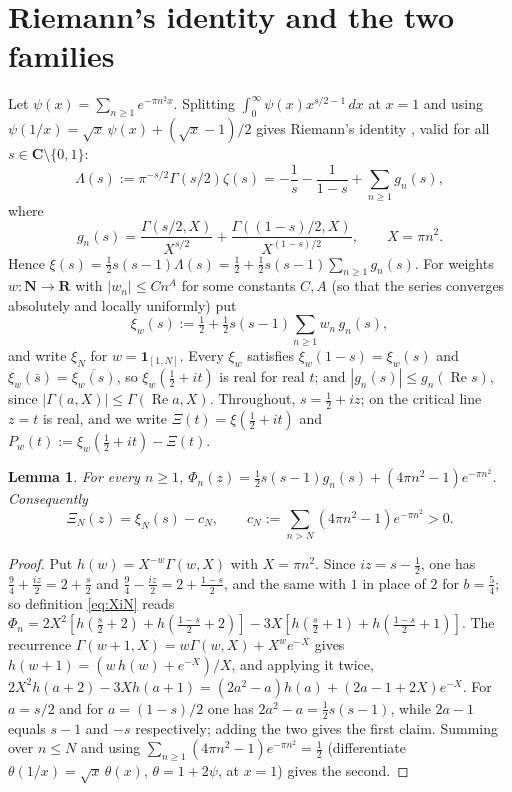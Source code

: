 \documentclass[11pt]{article}
\theoremstyle{plain}
\newtheorem{lemma}[theorem]{Lemma}
\theoremstyle{definition}
\theoremstyle{remark}
\newcommand{\R}{\mathbf{R}}
\newcommand{\Cx}{\mathbf{C}}
\newcommand{\N}{\mathbf{N}}
\newcommand{\re}{\operatorname{Re}}
\begin{document}
\section{Riemann's identity and the two families}
\label{sec:riemann}

Let $\psi(x) = \sum_{n \ge 1} e^{-\pi n^2 x}$. Splitting
$\int_0^\infty \psi(x)x^{s/2-1}\,dx$ at $x = 1$ and using
$\psi(1/x) = \sqrt{x}\,\psi(x) + (\sqrt{x}-1)/2$ gives Riemann's identity
\cite{Rie, Edw}, valid for all $s \in \Cx \setminus \{0, 1\}$:
\begin{equation}\label{eq:riemann}
\Lambda(s) := \pi^{-s/2}\Gamma(s/2)\zeta(s) = -\frac1s - \frac{1}{1-s}
+ \sum_{n \ge 1} g_n(s),
\end{equation}
where
\[
g_n(s) = \frac{\Gamma(s/2, X)}{X^{s/2}} + \frac{\Gamma((1-s)/2, X)}{X^{(1-s)/2}},
\qquad X = \pi n^2 .
\]
Hence $\xi(s) = \tfrac12 s(s-1)\Lambda(s) = \tfrac12 + \tfrac12 s(s-1)\sum_{n\ge1}
g_n(s)$. For weights $w\colon \N \to \R$ with $|w_n| \le Cn^A$ for some constants $C, A$
(so that the series converges absolutely and locally uniformly) put
\begin{equation}\label{eq:xiw}
\xi_w(s) := \tfrac12 + \tfrac12 s(s-1)\sum_{n \ge 1} w_n\, g_n(s),
\end{equation}
and write $\xi_N$ for $w = \mathbf{1}_{[1,N]}$. Every $\xi_w$ satisfies
$\xi_w(1-s) = \xi_w(s)$ and $\xi_w(\bar s) = \overline{\xi_w(s)}$, so
$\xi_w(\tfrac12 + it)$ is real for real $t$; and
$|g_n(s)| \le g_n(\re s)$, since $|\Gamma(a, X)| \le \Gamma(\re a, X)$.
Throughout, $s = \tfrac12 + iz$; on the critical line $z = t$ is real, and we
write $\Xi(t) = \xi(\tfrac12 + it)$ and
$P_w(t) := \xi_w(\tfrac12 + it) - \Xi(t)$.

\begin{lemma}\label{lem:relation}
For every $n \ge 1$, $\Phi_n(z) = \tfrac12 s(s-1)g_n(s) + (4\pi n^2 - 1)e^{-\pi n^2}$.
Consequently
\[
\Xi_N(z) = \xi_N(s) - c_N, \qquad
c_N := \sum_{n > N}(4\pi n^2 - 1)e^{-\pi n^2} > 0 .
\]
\end{lemma}

\begin{proof}
Put $h(w) = X^{-w}\Gamma(w, X)$ with $X = \pi n^2$. Since $iz = s - \tfrac12$,
one has $\tfrac94 + \tfrac{iz}{2} = 2 + \tfrac s2$ and
$\tfrac94 - \tfrac{iz}{2} = 2 + \tfrac{1-s}{2}$, and the same with $1$ in place
of $2$ for $b = \tfrac54$; so definition \eqref{eq:XiN} reads
$\Phi_n = 2X^2[h(\tfrac s2 + 2) + h(\tfrac{1-s}2 + 2)]
- 3X[h(\tfrac s2 + 1) + h(\tfrac{1-s}2 + 1)]$.
The recurrence $\Gamma(w+1, X) = w\Gamma(w, X) + X^w e^{-X}$ gives
$h(w+1) = (w\,h(w) + e^{-X})/X$, and applying it twice,
$2X^2 h(a+2) - 3X h(a+1) = (2a^2 - a)h(a) + (2a - 1 + 2X)e^{-X}$. For
$a = s/2$ and for $a = (1-s)/2$ one has $2a^2 - a = \tfrac12 s(s-1)$, while
$2a - 1$ equals $s - 1$ and $-s$ respectively; adding the two gives the first
claim. Summing over $n \le N$ and using
$\sum_{n \ge 1}(4\pi n^2 - 1)e^{-\pi n^2} = \tfrac12$ (differentiate
$\theta(1/x) = \sqrt{x}\,\theta(x)$, $\theta = 1 + 2\psi$, at $x = 1$) gives the
second.
\end{proof}
\end{document}
